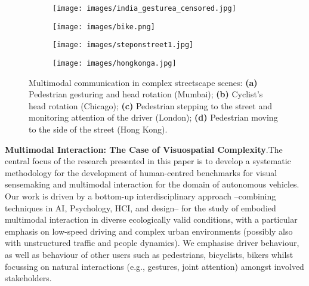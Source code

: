 \documentclass[a4paper]{article}
\begin{document}
 \begin{figure}[t]
 \centering
 \begin{subfigure}[c]{0.21\textwidth}
 \texttt{[image: images/india\_gesturea\_censored.jpg]}
 \subcaption{}
 \label{india_gesture}
 \end{subfigure}
 \begin{subfigure}[c]{0.21\textwidth}
 \texttt{[image: images/bike.png]}
 \subcaption{}
 \label{bike}
 \end{subfigure}
 \begin{subfigure}[c]{0.21\textwidth}
  \texttt{[image: images/steponstreet1.jpg]}
 \subcaption{}
 \label{london_steponstreet}
 \end{subfigure}
 \begin{subfigure}[c]{0.21\textwidth}
 \texttt{[image: images/hongkonga.jpg]}
 \subcaption{}
 \label{hongkong}
 \end{subfigure}
 
\caption{{\sffamily\small Multimodal communication in complex streetscape scenes:  \textbf{(a)} Pedestrian gesturing and head rotation (Mumbai); \textbf{(b)} Cyclist's head rotation (Chicago); \textbf{(c)} Pedestrian stepping to the street and monitoring attention of the driver (London); \textbf{(d)} Pedestrian moving to the side of the street (Hong Kong).}}
 \label{}
 \end{figure}

\smallskip

\textbf{\sffamily Multimodal Interaction: The Case of Visuospatial Complexity}.\quad The central focus of the research presented in this paper is to develop a systematic methodology for the development of human-centred benchmarks for visual sensemaking and multimodal interaction for the domain of autonomous vehicles. Our work is driven by a bottom-up interdisciplinary approach --combining techniques in AI, Psychology, HCI, and design-- for the study of embodied multimodal interaction in diverse ecologically valid conditions, with a particular emphasis on low-speed driving and complex urban environments (possibly also with unstructured traffic and people dynamics). We emphasise driver behaviour, as well as behaviour of other users such as pedestrians, bicyclists, bikers whilst focussing on natural interactions (e.g., gestures, joint attention) amongst involved stakeholders. 


\smallskip
\end{document}
